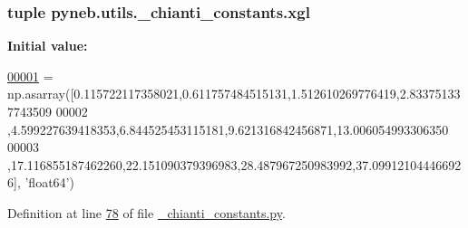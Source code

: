 \hypertarget{namespacepyneb_1_1utils_1_1__chianti__constants_af1590059269ec4a1186c9746d22d1201}{
\subsubsection[{xgl}]{\setlength{\rightskip}{0pt plus 5cm}tuple pyneb.\-utils.\-\_\-chianti\-\_\-constants.\-xgl}}\label{namespacepyneb_1_1utils_1_1__chianti__constants_af1590059269ec4a1186c9746d22d1201}
{\bfseries Initial value\-:}
\begin{DoxyCode}
\hypertarget{namespacepyneb_1_1utils_1_1__chianti__constants_l00001}{}\hyperlink{namespacepyneb_1_1utils_1_1__chianti__constants}{00001} = np.asarray([0.115722117358021,0.611757484515131,1.512610269776419,2.833751337743509
00002     ,4.599227639418353,6.844525453115181,9.621316842456871,13.006054993306350
00003     ,17.116855187462260,22.151090379396983,28.487967250983992,37.099121044466926], \textcolor{stringliteral}{'float64'})
\end{DoxyCode}


Definition at line \hyperlink{__chianti__constants_8py_source_l00078}{78} of file \hyperlink{__chianti__constants_8py_source}{\-\_\-chianti\-\_\-constants.\-py}.

